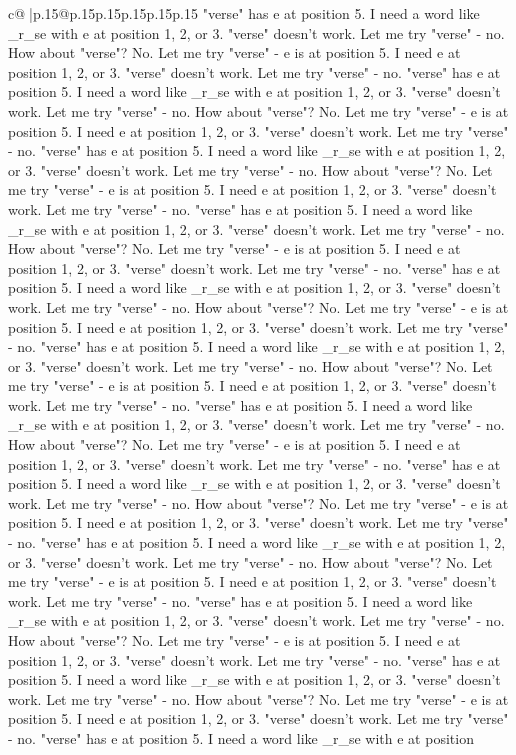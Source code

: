 \documentclass{article}
\begin{document}
{\begin{supertabular}{c@{$\;$}|p{.15\linewidth}@{}p{.15\linewidth}p{.15\linewidth}p{.15\linewidth}p{.15\linewidth}p{.15\linewidth}}
{{{"verse" has e at position 5. I need a word like \_r\_se with e at position 1, 2, or 3. "verse" doesn't work. Let me try "verse" {-} no. How about "verse"? No. Let me try "verse" {-} e is at position 5. I need e at position 1, 2, or 3. "verse" doesn't work. Let me try "verse" {-} no. "verse" has e at position 5. I need a word like \_r\_se with e at position 1, 2, or 3. "verse" doesn't work. Let me try "verse" {-} no. How about "verse"? No. Let me try "verse" {-} e is at position 5. I need e at position 1, 2, or 3. "verse" doesn't work. Let me try "verse" {-} no. "verse" has e at position 5. I need a word like \_r\_se with e at position 1, 2, or 3. "verse" doesn't work. Let me try "verse" {-} no. How about "verse"? No. Let me try "verse" {-} e is at position 5. I need e at position 1, 2, or 3. "verse" doesn't work. Let me try "verse" {-} no. "verse" has e at position 5. I need a word like \_r\_se with e at position 1, 2, or 3. "verse" doesn't work. Let me try "verse" {-} no. How about "verse"? No. Let me try "verse" {-} e is at position 5. I need e at position 1, 2, or 3. "verse" doesn't work. Let me try "verse" {-} no. "verse" has e at position 5. I need a word like \_r\_se with e at position 1, 2, or 3. "verse" doesn't work. Let me try "verse" {-} no. How about "verse"? No. Let me try "verse" {-} e is at position 5. I need e at position 1, 2, or 3. "verse" doesn't work. Let me try "verse" {-} no. "verse" has e at position 5. I need a word like \_r\_se with e at position 1, 2, or 3. "verse" doesn't work. Let me try "verse" {-} no. How about "verse"? No. Let me try "verse" {-} e is at position 5. I need e at position 1, 2, or 3. "verse" doesn't work. Let me try "verse" {-} no. "verse" has e at position 5. I need a word like \_r\_se with e at position 1, 2, or 3. "verse" doesn't work. Let me try "verse" {-} no. How about "verse"? No. Let me try "verse" {-} e is at position 5. I need e at position 1, 2, or 3. "verse" doesn't work. Let me try "verse" {-} no. "verse" has e at position 5. I need a word like \_r\_se with e at position 1, 2, or 3. "verse" doesn't work. Let me try "verse" {-} no. How about "verse"? No. Let me try "verse" {-} e is at position 5. I need e at position 1, 2, or 3. "verse" doesn't work. Let me try "verse" {-} no. "verse" has e at position 5. I need a word like \_r\_se with e at position 1, 2, or 3. "verse" doesn't work. Let me try "verse" {-} no. How about "verse"? No. Let me try "verse" {-} e is at position 5. I need e at position 1, 2, or 3. "verse" doesn't work. Let me try "verse" {-} no. "verse" has e at position 5. I need a word like \_r\_se with e at position 1, 2, or 3. "verse" doesn't work. Let me try "verse" {-} no. How about "verse"? No. Let me try "verse" {-} e is at position 5. I need e at position 1, 2, or 3. "verse" doesn't work. Let me try "verse" {-} no. "verse" has e at position 5. I need a word like \_r\_se with e at position 1, 2, or 3. "verse" doesn't work. Let me try "verse" {-} no. How about "verse"? No. Let me try "verse" {-} e is at position 5. I need e at position 1, 2, or 3. "verse" doesn't work. Let me try "verse" {-} no. "verse" has e at position 5. I need a word like \_r\_se with e at position }}}
\end{supertabular}}
\end{document}
